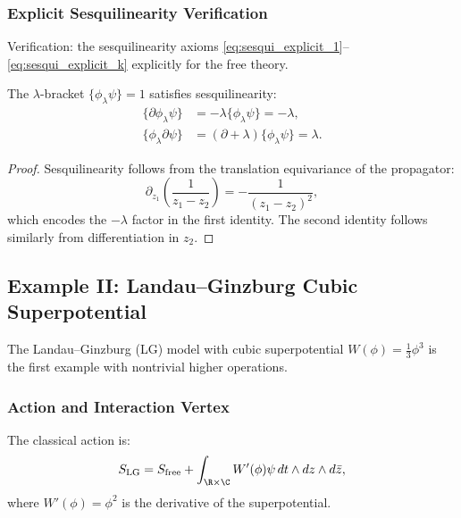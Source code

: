 \subsubsection{Explicit Sesquilinearity Verification}

Verification: the sesquilinearity axioms \eqref{eq:sesqui_explicit_1}--\eqref{eq:sesqui_explicit_k} explicitly for the free theory.
\begin{lemma}
The $\lambda$-bracket $\{\phi_\lambda \psi\} = 1$ satisfies sesquilinearity:
\begin{align}
\{\partial \phi_\lambda \psi\} &= -\lambda \{\phi_\lambda \psi\} = -\lambda, \\
\{\phi_\lambda \partial \psi\} &= (\partial + \lambda) \{\phi_\lambda \psi\} = \lambda.
\end{align}
\end{lemma}

\begin{proof}
Sesquilinearity follows from the translation equivariance of the propagator:
\begin{equation}
\partial_{z_1} \left( \frac{1}{z_1 - z_2} \right) = -\frac{1}{(z_1 - z_2)^2},
\end{equation}
which encodes the $-\lambda$ factor in the first identity. The second identity follows similarly from differentiation in $z_2$.
\end{proof}

\subsection{Example II: Landau--Ginzburg Cubic Superpotential}

The Landau--Ginzburg (LG) model with cubic superpotential $W(\phi) = \frac{1}{3} \phi^3$ is the first example with nontrivial higher operations.

\subsubsection{Action and Interaction Vertex}

The classical action is:
\begin{equation}
S_{\text{LG}} = S_{\text{free}} + \int_{\R \times \C} W'(\phi) \psi \, dt \wedge dz \wedge d\bar{z},
\end{equation}
where $W'(\phi) = \phi^2$ is the derivative of the superpotential.

